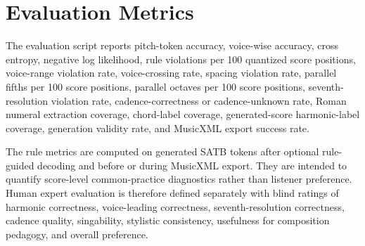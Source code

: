 \section{Evaluation Metrics}

The evaluation script reports pitch-token accuracy, voice-wise accuracy, cross entropy, negative log likelihood, rule violations per 100 quantized score positions, voice-range violation rate, voice-crossing rate, spacing violation rate, parallel fifths per 100 score positions, parallel octaves per 100 score positions, seventh-resolution violation rate, cadence-correctness or cadence-unknown rate, Roman numeral extraction coverage, chord-label coverage, generated-score harmonic-label coverage, generation validity rate, and MusicXML export success rate.

The rule metrics are computed on generated SATB tokens after optional rule-guided decoding and before or during MusicXML export. They are intended to quantify score-level common-practice diagnostics rather than listener preference. Human expert evaluation is therefore defined separately with blind ratings of harmonic correctness, voice-leading correctness, seventh-resolution correctness, cadence quality, singability, stylistic consistency, usefulness for composition pedagogy, and overall preference.
